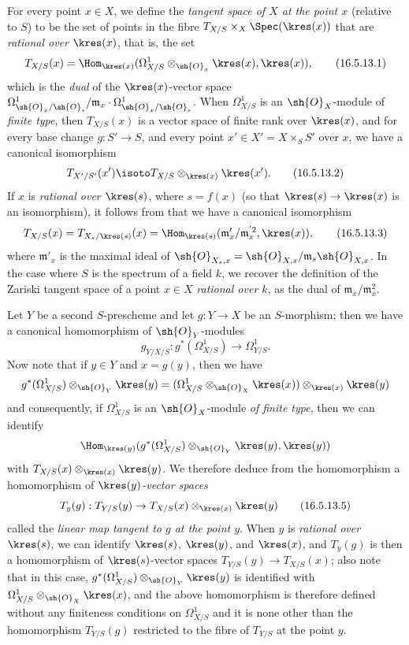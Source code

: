 \begin{env}[16.5.13]
\label{IV.16.5.13}
For every point $x \in X$, we define the \emph{tangent space of $X$ at the point $x$} (relative to $S$) to be the set of points in the fibre $T_{X/S} \times_X \Spec(\kres(x))$ that are \emph{rational over $\kres(x)$}, that is, the set
\[
\label{IV.16.5.13.1}
  T_{X/S}(x) = \Hom_{\kres(x)}(\Omega_{X/S}^1 \otimes_{\sh{O}_x} \kres(x), \kres(x)),
  \tag{16.5.13.1}
\]
which is the \emph{dual} of the $\kres(x)$-vector space $\Omega_{\sh{O}_x/\sh{O}_s}^1/\mathfrak{m}_x \cdot \Omega_{\sh{O}_x/\sh{O}_s}^1$.
When $\Omega_{X/S}^1$ is an $\sh{O}_X$-module of \emph{finite type}, then $T_{X/S}(x)$ is a vector space of finite rank over $\kres(x)$, and for every base change
$g : S' \to S$, and every point $x' \in X' = X \times_S S'$ over $x$, we have a canonical isomorphism
\[
  \label{IV.16.5.13.2}
  T_{X'/S'}(x') \isoto T_{X/S} \otimes_{\kres(x)} \kres(x').
  \tag{16.5.13.2}
\]
If $x$ is \emph{rational over $\kres(s)$}, where $s = f(x)$ (so that $\kres(s) \to \kres(x)$ is an isomorphism), it follows from  that we have a canonical isomorphism
\[
\label{IV.16.5.13.3}
  T_{X/S}(x) = T_{X_s/\kres(s)}(x) = \Hom_{\kres(s)}(\mathfrak{m}'_x/\mathfrak{m}_x^{'2}, \kres(x)),
  \tag{16.5.13.3}
\]
where $\mathfrak{m}'_x$ is the maximal ideal of $\sh{O}_{X_s,x} = \sh{O}_{X, x}/\mathfrak{m}_s \sh{O}_{X,x}$.
In the case where $S$ is the spectrum of a field $k$, we recover the definition of the Zariski tangent space of a point $x \in X$ \emph{rational over $k$}, as the dual of $\mathfrak{m}_x / \mathfrak{m}_x^2$.

Let $Y$ be a second $S$-prescheme and let $g : Y \to X$ be an $S$-morphism;
then we have a canonical homomorphism of $\sh{O}_Y$-modules 
\[
\label{IV.16.5.13.4}
  g_{Y/X/S} : g^*(\Omega_{X/S}^1) \to \Omega_{Y/S}^1.
  \tag{16.5.13.4}
\]
Now note that if $y \in Y$ and $x = g(y)$, then we have
\[
  g^*(\Omega_{X/S}^1) \otimes_{\sh{O}_Y} \kres(y) = (\Omega_{X/S}^1 \otimes_{\sh{O}_X} \kres(x)) \otimes_{\kres(x)} \kres(y) 
\]
and consequently, if $\Omega_{X/S}^1$ is an $\sh{O}_X$-module \emph{of finite type}, then we can identify
\[
  \Hom_{\kres(y)}(g^*(\Omega_{X/S}^1) \otimes_{\sh{O}_Y} \kres(y), \kres(y))
\]
with $T_{X/S}(x) \otimes_{\kres(x)} \kres(y)$.
We therefore deduce from the homomorphism  a homomorphism of \emph{$\kres(y)$-vector spaces}
\[
\label{IV.16.5.13.5}
  T_y(g) : T_{Y/S}(y) \to T_{X/S}(x) \otimes_{\kres(x)} \kres(y)
  \tag{16.5.13.5}
\]
called the \emph{linear map tangent to $g$ at the point $y$}.
When $y$ is \emph{rational over $\kres(s)$}, we can identify $\kres(s)$, $\kres(y)$, and $\kres(x)$, and $T_y(g)$ is then a homomorphism of $\kres(s)$-vector spaces $T_{Y/S}(y) \to T_{X/S}(x)$;
also note that in this case, $g^*(\Omega_{X/S}^1) \otimes_{\sh{O}_Y} \kres(y)$ is identified with $\Omega_{X/S}^1 \otimes_{\sh{O}_X} \kres(x)$, and the above homomorphism is therefore defined without any finiteness conditions on $\Omega_{X/S}^1$ and it is none other than the homomorphism $T_{Y/S}(g)$  restricted to the fibre of $T_{Y/S}$ at the point $y$.
\end{env}

